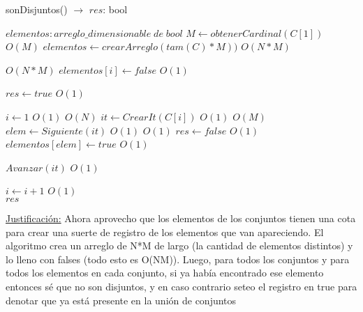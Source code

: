 \documentclass[10pt, a4paper]{article}
\begin{document}
\begin{algorithm}[H]{sonDisjuntos() $\to$ $res$: bool}	
	\begin{algorithmic}[1]
		\State $elementos: arreglo\_dimensionable\; de\; bool$
		\State $M \gets obtenerCardinal(C[1])$			\Comment $O(M)$		
		\State $elementos \gets crearArreglo(tam(C) * M))$	\Comment $O(N*M)$
		
					\Comment $O(N*M)$
			 \State $elementos[i] \gets false$			\Comment $O(1)$
		\EndFor
		
		\State $res \gets true$			\Comment $O(1)$
		
		\State $i \gets 1$	\Comment $O(1)$
					\Comment $O(N)$
			\State $it \gets CrearIt(C[i])$	\Comment $O(1)$
						\Comment $O(M)$
				\State $elem \gets Siguiente(it)$			\Comment $O(1)$	
				 			\Comment $O(1)$	
					\State $res \gets false$	\Comment $O(1)$
				\Else
					\State $elementos[elem] \gets true$	\Comment $O(1)$
				\EndIf

				\State $Avanzar(it)$			\Comment $O(1)$		 	
			\EndWhile

			\State $i\gets i+1$			\Comment $O(1)$		 	
		\EndWhile \\
		
		\Return $res$
	
		\medskip
		\Statex \underline{Justificación:} Ahora aprovecho que los elementos de los conjuntos tienen una cota para crear una suerte de registro de los elementos que van apareciendo. El algoritmo crea un arreglo de N*M de largo (la cantidad de elementos distintos) y lo lleno con falses (todo esto es O(NM)). Luego, para todos los conjuntos y para todos los elementos en cada conjunto, si ya había encontrado ese elemento entonces sé que no son disjuntos, y en caso contrario seteo el registro en true para denotar que ya está presente en la unión de conjuntos
    \end{algorithmic}
\end{algorithm}	
\end{document}
